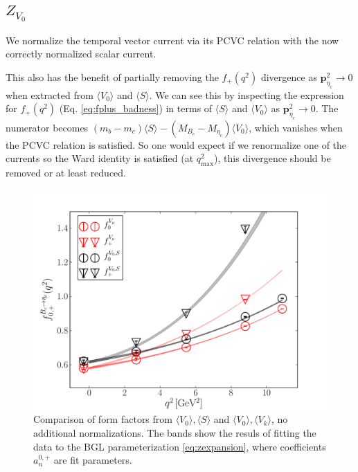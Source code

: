 \subsection{$Z_{V_0}$}
\label{sec:ZV0}

We normalize the temporal vector current via its PCVC relation with the now correctly normalized scalar current.

This also has the benefit of partially removing the $f_+(q^2)$ divergence as ${\textbf{p}}^2_{\eta_c}\to 0$ when extracted from $\langle V_0 \rangle$ and $\langle S \rangle$. We can see this by inspecting the expression for $f_+(q^2)$ (Eq. \eqref{eq:fplus_badness}) in terms of $\langle S \rangle$ and $\langle V_0 \rangle$ as ${\textbf{p}}_{\eta_c}^2 \to 0$. The numerator becomes $(m_b-m_c) \langle S \rangle - (M_{B_c}-M_{\eta_c}) \langle V_0 \rangle$, which vanishes when the PCVC relation is satisfied. So one would expect if we renormalize one of the currents so the Ward identity is satisfied (at $q^2_{\text{max}}$), this divergence should be removed or at least reduced.

\begin{figure}[htb!]
\centering
\includegraphics[scale=0.55]{images/nrqcd/Bcetac_bothways_1.pdf}
\caption{Comparison of form factors from $\langle V_0 \rangle, \langle S \rangle$ and $\langle V_0 \rangle,\langle V_k \rangle$, no additional normalizations. The bands show the resuls of fitting the data to the BGL parameterization \eqref{eq:zexpansion}, where coefficients $a^{0,+}_n$ are fit parameters. \label{fig:naive}}
\end{figure}

